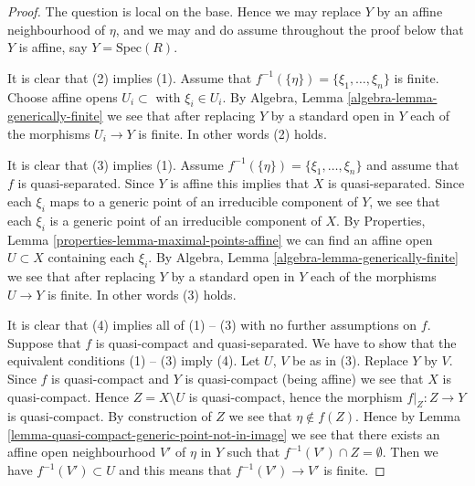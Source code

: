 \begin{proof}
The question is local on the base. Hence we may replace $Y$ by an
affine neighbourhood of $\eta$, and we may and do assume throughout
the proof below that $Y$ is affine, say $Y = \text{Spec}(R)$.

\medskip\noindent
It is clear that (2) implies (1).
Assume that $f^{-1}(\{\eta\}) = \{\xi_1, \ldots, \xi_n\}$ is finite.
Choose affine opens $U_i \subset$ with $\xi_i \in U_i$.
By Algebra, Lemma \ref{algebra-lemma-generically-finite} we see
that after replacing $Y$ by a standard open in
$Y$ each of the morphisms $U_i \to Y$ is finite.
In other words (2) holds.

\medskip\noindent
It is clear that (3) implies (1).
Assume $f^{-1}(\{\eta\}) = \{\xi_1, \ldots, \xi_n\}$ and assume
that $f$ is quasi-separated.
Since $Y$ is affine this implies that $X$ is quasi-separated.
Since each $\xi_i$ maps to a generic point of an irreducible component
of $Y$, we see that each $\xi_i$ is a generic point of an irreducible
component of $X$.
By Properties, Lemma \ref{properties-lemma-maximal-points-affine}
we can find an affine open $U \subset X$ containing each $\xi_i$.
By Algebra, Lemma \ref{algebra-lemma-generically-finite} we see
that after replacing $Y$ by a standard open in
$Y$ each of the morphisms $U \to Y$ is finite.
In other words (3) holds.

\medskip\noindent
It is clear that (4) implies all of (1) -- (3) with no further assumptions
on $f$. Suppose that $f$ is quasi-compact and quasi-separated. We have to
show that the equivalent conditions (1) -- (3) imply (4).
Let $U$, $V$ be as in (3). Replace $Y$ by $V$. Since $f$ is quasi-compact
and $Y$ is quasi-compact (being affine) we see that $X$ is quasi-compact.
Hence $Z = X \setminus U$ is quasi-compact, hence the morphism
$f|_Z : Z \to Y$ is quasi-compact. By construction of $Z$ we see that
$\eta \not \in f(Z)$. Hence by
Lemma \ref{lemma-quasi-compact-generic-point-not-in-image}
we see that there exists an affine open
neighbourhood $V'$ of $\eta$ in $Y$ such that $f^{-1}(V') \cap Z = \emptyset$.
Then we have $f^{-1}(V') \subset U$ and this means
that $f^{-1}(V') \to V'$ is finite.
\end{proof}

